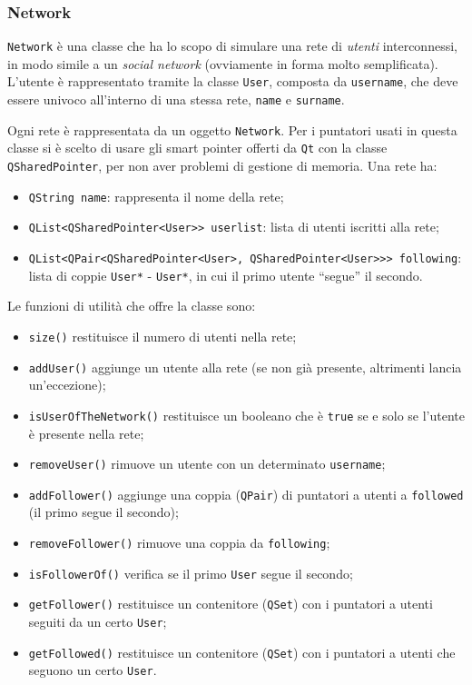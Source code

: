 \subsubsection{Network}
\texttt{Network} è una classe che ha lo scopo di simulare una rete di \emph{utenti} interconnessi, in modo simile
a un \emph{social network} (ovviamente in forma molto semplificata).
L'utente è rappresentato tramite la classe \texttt{User}, composta da \texttt{username}, che deve essere
univoco all'interno di una stessa rete, \texttt{name} e \texttt{surname}. \par
Ogni rete è rappresentata da un oggetto \texttt{Network}. Per i puntatori usati in questa classe si è scelto
di usare gli smart pointer offerti da \texttt{Qt} con la classe \texttt{QSharedPointer}, per non aver problemi di gestione
di memoria. Una rete ha:
\begin{itemize}
    \item \texttt{QString name}: rappresenta il nome della rete;
    \item \texttt{QList<QSharedPointer<User>> userlist}: lista di utenti iscritti alla rete;
    \item \texttt{QList<QPair<QSharedPointer<User>, QSharedPointer<User>>> following}: lista di coppie
    \texttt{User*} - \texttt{User*}, in cui il primo utente ``segue'' il secondo.
\end{itemize}

Le funzioni di utilità che offre la classe sono:
\begin{itemize}[noitemsep]
    \item \texttt{size()} restituisce il numero di utenti nella rete;
    \item \texttt{addUser()} aggiunge un utente alla rete (se non già presente, altrimenti lancia un'eccezione);
    \item \texttt{isUserOfTheNetwork()} restituisce un booleano che è \texttt{true} se e solo se l'utente è presente
    nella rete;
    \item \texttt{removeUser()} rimuove un utente con un determinato \texttt{username};
    \item \texttt{addFollower()} aggiunge una coppia (\texttt{QPair}) di puntatori a utenti a \texttt{followed} (il primo segue
    il secondo);
    \item \texttt{removeFollower()} rimuove una coppia da \texttt{following};
    \item \texttt{isFollowerOf()} verifica se il primo \texttt{User} segue il secondo;
    \item \texttt{getFollower()} restituisce un contenitore (\texttt{QSet}) con i puntatori a utenti seguiti da un certo \texttt{User};
    \item \texttt{getFollowed()} restituisce un contenitore (\texttt{QSet}) con i puntatori a utenti che seguono un certo \texttt{User}.
\end{itemize}

